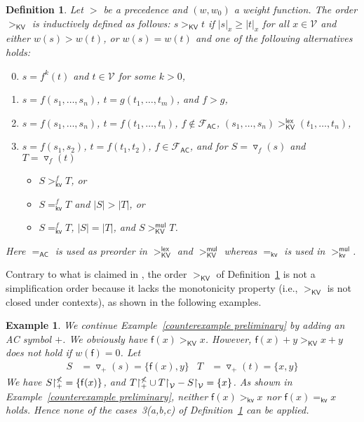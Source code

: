 \documentclass{tlp}
\newtheorem{definition}[theorem]{Definition}
\newtheorem{example}[theorem]{Example}
\newcommand{\tf}[1]{{\triangledown_{\!#1}}}
\newcommand{\m}[1]{\mathsf{#1}}
\newcommand{\mc}[1]{\mathcal{#1}}
\newcommand{\mr}[1]{\mathrm{#1}}
\newcommand{\Wt}{\m{w,root}}
\renewcommand{\Wt}{\m{kv}}
\newcommand{\lex}{\m{lex}}
\newcommand{\mul}{\m{mul}}
\newcommand{\FF}{\mc{F}}
\newcommand{\VV}{\mc{V}}
\newcommand{\AC}{\mr{\m{AC}}}
\newcommand{\KV}{\mr{\m{KV}}}
\newcommand{\seq}[2][n]{{#2_1},\dots,{#2_{#1}}}
\newcommand{\rrs}[3][f]{{#2}{\restriction}^{\smash{#3}}_{#1}}
\begin{document}
\begin{definition}
\label{def:KV}
Let $>$ be a precedence and $(w,w_0)$ a weight function.
The order $>_\KV$ is inductively defined as follows: $s >_\KV t$ if
$|s|_x \geqslant |t|_x$ for all $x \in \VV$ and either $w(s) > w(t)$, or
$w(s) = w(t)$ and one of the following alternatives holds:
\begin{enumerate}
\setcounter{enumi}{-1}
\item
$s = f^k(t)$ and $t \in \VV$ for some $k > 0$,
\smallskip
\item
$s = f(\seq{s})$, $t = g(\seq[m]{t})$, and $f > g$,
\smallskip
\item
$s = f(\seq{s})$, $t = f(\seq{t})$, $f \notin \FF_\AC$,
$(\seq{s}) >_\KV^\lex (\seq{t})$,
\item
\smallskip
$s = f(s_1,s_2)$, $t = f(t_1,t_2)$, $f \in \FF_\AC$,
and for $S = \tf{f}(s)$ and $T = \tf{f}(t)$
\begin{itemize}
\item[(a)]
\smallskip
$S >_\Wt^f T$,
or
\item[(b)]
\smallskip
$S =_\Wt^f T$ and $|S| > |T|$, or
\item[(c)]
\smallskip
$S =_\Wt^f T$, $|S| = |T|$, and $S >_\KV^\mul T$.
\end{itemize}
\end{enumerate}
Here $=_\AC$ is used as preorder in $>_\KV^\lex$ and $>_\KV^\mul$
whereas $=_\Wt$ is used in $>_\Wt^\mul$.
\end{definition}

Contrary to what is claimed in \cite{KV03b}, the order $>_\KV$
of Definition~\ref{def:KV}
is not a simplification order because it lacks the monotonicity property
(i.e., $>_\KV$ is not closed under contexts),
as shown in the following examples.

\begin{example}
\label{counterexample}
We continue Example~\ref{counterexample preliminary}
by adding an AC symbol $+$.
We obviously have $\m{f}(x) >_\KV x$. However,
$\m{f}(x) + y >_\KV x + y$ does not hold if $w(\m{f}) = 0$.
Let 
\begin{align*}
S &= \tf{+}(s) = \{ \m{f}(x), y \} &
T &= \tf{+}(t) = \{ x, y \}
\end{align*}
We have
$\rrs[+]{S}{\nless} = \{ \m{f}(x) \}$,
and $\rrs[+]{T}{\nless} \cup T{\restriction}_\VV - S{\restriction}_\VV =
\{ x \}$.
As shown in Example~\ref{counterexample preliminary},
neither $\m{f}(x) >_\Wt x$ nor $\m{f}(x) =_\Wt x$ holds.
Hence none of the cases~3(a,b,c) of Definition~\ref{def:KV} can be applied.
\end{example}
\end{document}
